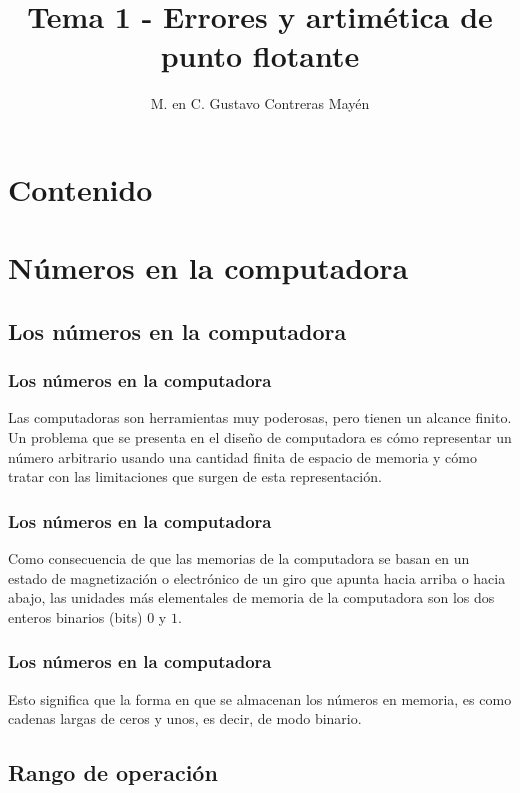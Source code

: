 \documentclass[12pt]{beamer}
\title{\large{Tema 1 - Errores y artimética de punto flotante}}
\author{M. en C. Gustavo Contreras Mayén}
\date{ }
\begin{document}
\maketitle

\section*{Contenido}

\section{Números en la computadora}
\subsection{Los números en la computadora}

\begin{frame}
\frametitle{Los números en la computadora}
Las computadoras son herramientas muy poderosas, pero tienen un alcance finito.
\\
\bigskip
\pause
Un problema que se presenta en el diseño de computadora es cómo representar un número arbitrario usando una cantidad finita de espacio de memoria y cómo tratar con las limitaciones que surgen de esta representación.
\end{frame}
\begin{frame}
\frametitle{Los números en la computadora}
Como consecuencia de que las memorias de la computadora se basan en un estado de magnetización o electrónico de un giro que apunta hacia arriba o hacia abajo, las unidades más elementales de memoria de la computadora son los dos enteros binarios (bits) $0$ y $1$.
\end{frame}
\begin{frame}
\frametitle{Los números en la computadora}
Esto significa que la forma en que se almacenan los números en memoria, es como cadenas largas de ceros y unos, es decir, de modo binario.
\end{frame}

\subsection{Rango de operación}
\end{document}
